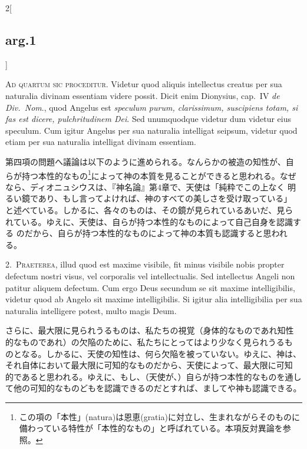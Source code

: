 \documentclass[paper=a4paper,fontsize=10pt,jafontsize=9pt,titlepage]{jlreq}
\begin{document}
\begin{paracol}{2}[\subsection{arg.1}]

{\scshape Ad quartum sic proceditur}. Videtur quod aliquis intellectus
creatus per sua naturalia divinam essentiam videre possit. Dicit enim
Dionysius, cap.\ IV {\itshape de Div.\ Nom}., quod Angelus est {\itshape
speculum purum, clarissimum, suscipiens totam, si fas est dicere,
pulchritudinem Dei}. Sed unumquodque videtur dum videtur eius
speculum. Cum igitur Angelus per sua naturalia intelligat seipsum,
videtur quod etiam per sua naturalia intelligat divinam essentiam.

\switchcolumn

第四項の問題へ議論は以下のように進められる。なんらかの被造の知性が、自
らが持つ本性的なもの\footnote{この項の「本性」(natura)は恩恵(gratia)に対立し、生まれながらそのものに備わっている特性が「本性的なもの」と呼ばれている。本項反対異論を参照。}によって神の本質を見ることができると思われる。なぜ
なら、ディオニュシウスは、『神名論』第4章で、天使は「純粋でこの上なく
明るい鏡であり、もし言ってよければ、神のすべての美しさを受け取っている」
と述べている。しかるに、各々のものは、その鏡が見られているあいだ、見ら
れている。ゆえに、天使は、自らが持つ本性的なものによって自己自身を認識する
のだから、自らが持つ本性的なものによって神の本質も認識すると思われる。


2.~{\scshape Praeterea}, illud quod est maxime visibile, fit minus visibile
nobis propter defectum nostri visus, vel corporalis vel
intellectualis. Sed intellectus Angeli non patitur aliquem
defectum. Cum ergo Deus secundum se sit maxime intelligibilis, videtur
quod ab Angelo sit maxime intelligibilis. Si igitur alia
intelligibilia per sua naturalia intelligere potest, multo magis Deum.

\switchcolumn

さらに、最大限に見られうるものは、私たちの視覚（身体的なものであれ知性
的なものであれ）の欠陥のために、私たちにとってはより少なく見られうるも
のとなる。しかるに、天使の知性は、何ら欠陥を被っていない。ゆえに、神は、
それ自体において最大限に可知的なものだから、天使によって、最大限に可知
的であると思われる。ゆえに、もし、（天使が、）自らが持つ本性的なものを通し
て他の可知的なものどもを認識できるのだとすれば、ましてや神も認識できる。


\end{paracol}
\end{document}
